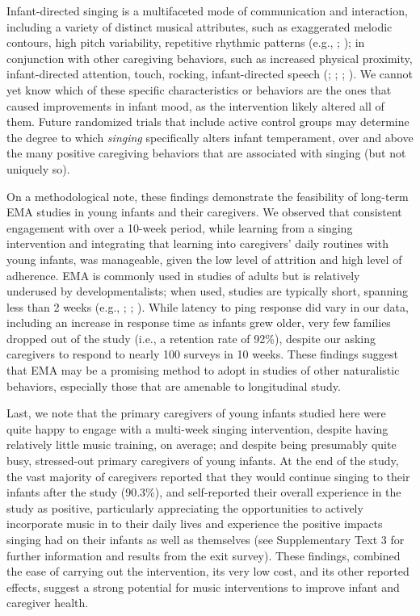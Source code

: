 \documentclass[
]{article}
\begin{document}
Infant-directed singing is a multifaceted mode of communication and
interaction, including a variety of distinct musical attributes, such as
exaggerated melodic contours, high pitch variability, repetitive
rhythmic patterns (e.g., ; ); in conjunction with other caregiving behaviors, such as
increased physical proximity, infant-directed attention, touch, rocking,
infant-directed speech (;
;
;
). We cannot
yet know which of these specific characteristics or behaviors are the
ones that caused improvements in infant mood, as the intervention likely
altered all of them. Future randomized trials that include active
control groups may determine the degree to which \emph{singing}
specifically alters infant temperament, over and above the many positive
caregiving behaviors that are associated with singing (but not uniquely
so).

On a methodological note, these findings demonstrate the feasibility of
long-term EMA studies in young infants and their caregivers. We observed
that consistent engagement with over a 10-week period, while learning
from a singing intervention and integrating that learning into
caregivers' daily routines with young infants, was manageable, given the
low level of attrition and high level of adherence. EMA is commonly used
in studies of adults but is relatively underused by developmentalists;
when used, studies are typically short, spanning less than 2 weeks
(e.g., ;
;
). While latency to ping
response did vary in our data, including an increase in response time as
infants grew older, very few families dropped out of the study (i.e., a
retention rate of 92\%), despite our asking caregivers to respond to
nearly 100 surveys in 10 weeks. These findings suggest that EMA may be a
promising method to adopt in studies of other naturalistic behaviors,
especially those that are amenable to longitudinal study.

Last, we note that the primary caregivers of young infants studied here
were quite happy to engage with a multi-week singing intervention,
despite having relatively little music training, on average; and despite
being presumably quite busy, stressed-out primary caregivers of young
infants. At the end of the study, the vast majority of caregivers
reported that they would continue singing to their infants after the
study (90.3\%), and self-reported their overall experience in the study
as positive, particularly appreciating the opportunities to actively
incorporate music in to their daily lives and experience the positive
impacts singing had on their infants as well as themselves (see
Supplementary Text 3 for further information and results from the exit
survey). These findings, combined the ease of carrying out the
intervention, its very low cost, and its other reported effects, suggest
a strong potential for music interventions to improve infant and
caregiver health.
\end{document}
